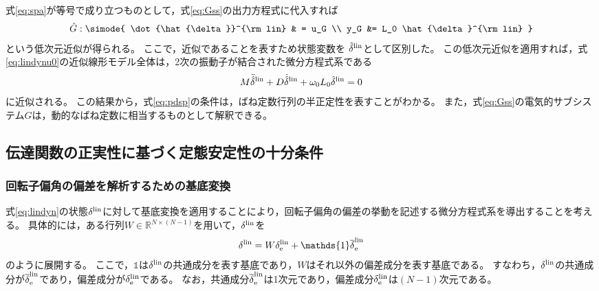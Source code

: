\documentclass[tombow,dvipdfmx]{corona-a5}
\begin{document}
式\ref{eq:spa}が等号で成り立つものとして，式\ref{eq:Gss}の出力方程式に代入すれば
\begin{align}\label{eq:Gsssp}
\hat{G}: \simode{
\dot{\hat{\delta}}^{\rm lin} & = u_G \\
y_G &= L_0 \hat{\delta}^{\rm lin}
}
\end{align}
という低次元近似が得られる。
ここで，近似であることを表すため状態変数を
$\hat{\delta}^{\rm lin}$として区別した。
この低次元近似を適用すれば，式\ref{eq:lindynu0}の近似線形モデル全体は，2次の振動子が結合された微分方程式系である
\begin{align}\label{eq:spamodel}
M \ddot{\hat{\delta}}^{\rm lin}
+ D \dot{\hat{\delta}}^{\rm lin}
+\omega_0 L_0 \hat{\delta}^{\rm lin}=0
\end{align}
に近似される。
この結果から，式\ref{eq:pdsp}の条件は，ばね定数行列の半正定性を表すことがわかる。
また，式\ref{eq:Gss}の電気的サブシステム$G$は，動的なばね定数に相当するものとして解釈できる。


\subsection{伝達関数の正実性に基づく定態安定性の十分条件\advanced}

\subsubsection{回転子偏角の偏差を解析するための基底変換}

式\ref{eq:lindyn}の状態$\delta^{\rm lin}$に対して基底変換を適用することにより，回転子偏角の偏差の挙動を記述する微分方程式系を導出することを考える。
具体的には，ある行列$W \in \mathbb{R}^{N\times (N-1)}$を用いて，$\delta^{\rm lin}$を
\begin{align}\label{eq:batrinv}
\delta^{\rm lin}
=
W
\delta^{\rm lin}_{\rm e} +
\mathds{1}
\overline{\delta}^{\rm lin}_{\rm e}
\end{align}
のように展開する。
ここで，$\mathds{1}$は$\delta^{\rm lin}$の共通成分を表す基底であり，$W$はそれ以外の偏差成分を表す基底である。
すなわち，$\delta^{\rm lin}$の共通成分が$\overline{\delta}^{\rm lin}_{\rm e}$であり，偏差成分が$\delta^{\rm lin}_{\rm e}$である。
なお，共通成分$\overline{\delta}^{\rm lin}_{\rm e}$は1次元であり，偏差成分$\delta^{\rm lin}_{\rm e}$は$(N-1)$次元である。
\end{document}

